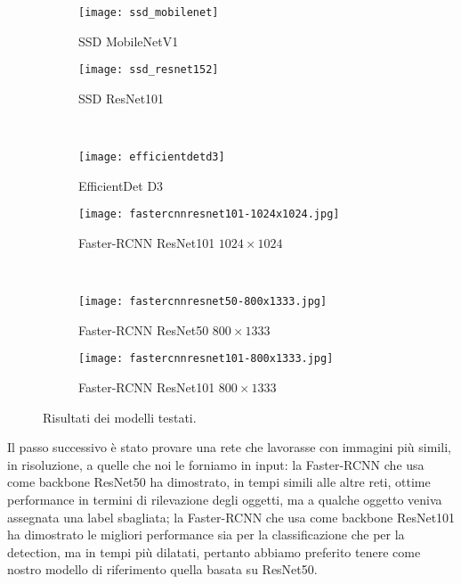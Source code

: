 \begin{figure}[t]
    \centering
    \hfill
    \begin{subfigure}[b]{0.49\textwidth}
        \centering
        \texttt{[image: ssd\_mobilenet]}
        \caption{SSD MobileNetV1}
    \end{subfigure}
    \hfill
    \begin{subfigure}[b]{0.49\textwidth}
        \centering
        \texttt{[image: ssd\_resnet152]}
        \caption{SSD ResNet101}
    \end{subfigure}
    \hfill \\
    \hfill
    \begin{subfigure}[b]{0.49\textwidth}
        \centering
        \texttt{[image: efficientdetd3]}
        \caption{EfficientDet D3}
    \end{subfigure}
    \hfill
    \begin{subfigure}[b]{0.49\textwidth}
        \centering
        \texttt{[image: fastercnnresnet101-1024x1024.jpg]}
        \caption{Faster-RCNN ResNet101 $1024\times 1024$}
    \end{subfigure}
    \hfill \\
    \hfill
    \begin{subfigure}[b]{0.49\textwidth}
        \centering
        \texttt{[image: fastercnnresnet50-800x1333.jpg]}
        \caption{Faster-RCNN ResNet50 $800\times 1333$}
    \end{subfigure}
    \hfill
    \begin{subfigure}[b]{0.49\textwidth}
        \centering
        \texttt{[image: fastercnnresnet101-800x1333.jpg]}
        \caption{Faster-RCNN ResNet101 $800\times 1333$}
    \end{subfigure}
    \hfill
    \caption{Risultati dei modelli testati.}
\end{figure}


Il passo successivo è stato provare una rete che lavorasse con immagini più simili, in risoluzione, a quelle che noi le forniamo in input: la Faster-RCNN che usa come backbone ResNet50 ha dimostrato, in tempi simili alle altre reti, ottime performance in termini di rilevazione degli oggetti, ma a qualche oggetto veniva assegnata una label sbagliata; la Faster-RCNN che usa come backbone ResNet101 ha dimostrato le migliori performance sia per la classificazione che per la detection, ma in tempi più dilatati, pertanto abbiamo preferito tenere come nostro modello di riferimento quella basata su ResNet50.

